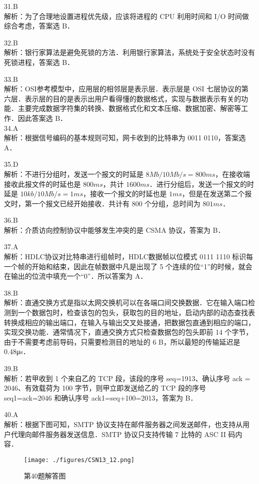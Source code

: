 31.B \\
解析：为了合理地设置进程优先级，应该将进程的 CPU 利用时间和 I/O 时间做综合考虑，答案选 B．

32.B \\
解析：银行家算法是避免死锁的方法．利用银行家算法，系统处于安全状态时没有死锁进程，答案选 B．

33.B \\
解析：OSI参考模型中，应用层的相邻层是表示层．表示层是 OSI 七层协议的第六层．表示层的目的是表示出用户看得懂的数据格式，实现与数据表示有关的功能．主要完成数据字符集的转换、数据格式化和文本压缩、数据加密、解密等工作．因此答案选 B． \\

34.A \\
解析：根据信号编码的基本规则可知，网卡收到的比特串为 0011 0110，答案选 A．

35.D \\
解析：不进行分组时，发送一个报文的时延是 $8Mb/10Mb/s=800ms$，在接收端接收此报文件的时延也是 $800ms$，共计 $1600ms$．进行分组后，发送一个报文的时延是 $10kb/10Mb/s=1ms$，接收一个报文的时延也是 $1ms$，但是在发送第二个报文时，第一个报文已经开始接收．共计有 $800$ 个分组，总时间为 $801ms$．

36.B \\
解析：介质访向控制协议中能够发生冲突的是 CSMA 协议，答案为 B．

37.A \\
解析：HDLC协议对比特串进行组帧时，HDLC数据帧以位模式 0111 1110 标识每一个帧的开始和结束，因此在帧数据中凡是出现了 5 个连续的位“1”的时候，就会在输出的位流中填充一个“0”．所以答案为 A．

38.B \\
解析：直通交换方式是指以太网交换机可以在各端口间交换数据．它在输入端口检测到一个数据包时，检查该包的包头，获取包的目的地址，启动内部的动态查找表转换成相应的输出端口，在输入与输出交叉处接通，把数据包直通到相应的端口，实现交换功能．通常情况下，直通交换方式只检查数据包的包头即前 14 个字节，由于不需要考虑前导码，只需要检测目的地址的 6 B，所以最短的传输延迟是 0.48μs．

39.B \\
解析：若甲收到 1 个来自乙的 TCP 段，该段的序号 seq=1913、确认序号 ack = 2046、有效载荷为 100 字节，则甲立即发送给乙的 TCP 段的序号 seq1=ack=2046 和确认序号 ack1=seq+100=2013，答案为 B．

40.A \\
解析：根据下图可知，SMTP 协议支持在邮件服务器之间发送邮件，也支持从用户代理向邮件服务器发送信息．SMTP 协议只支持传输 7 比特的 ASC II 码内容．
\begin{figure}[ht]
\centering
\texttt{[image: ./figures/CSN13\_12.png]}
\caption{第40题解答图} \label{CSN13_fig12}
\end{figure}


